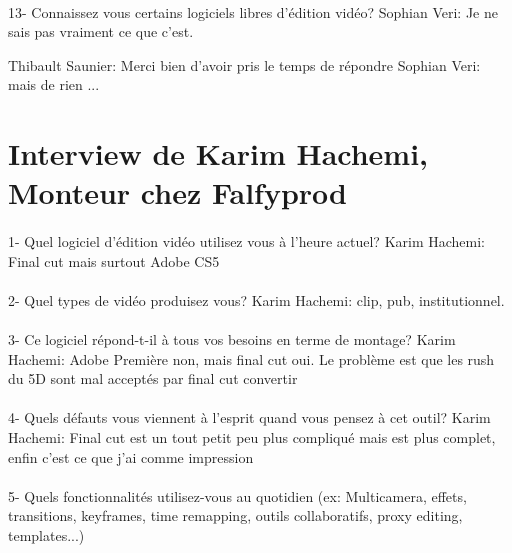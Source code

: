 \paragraph{}
13- Connaissez vous certains logiciels libres d'édition vidéo?
Sophian Veri: Je ne sais pas vraiment ce que c'est.

Thibault Saunier: Merci bien d'avoir pris le temps de répondre
    Sophian Veri: mais de rien
    ...

\section*{Interview de Karim Hachemi, Monteur chez Falfyprod}

\paragraph{}
1-  Quel logiciel d'édition vidéo utilisez vous à l'heure actuel?
Karim Hachemi: Final cut mais surtout Adobe CS5

\paragraph{}
2- Quel types de vidéo produisez vous?
Karim Hachemi: clip, pub, institutionnel.

\paragraph{}
3- Ce logiciel répond-t-il à tous vos besoins en terme de montage?
Karim Hachemi: Adobe Première non, mais final cut oui. Le problème est que les
rush du 5D sont mal acceptés par final cut%
convertir %
\paragraph{}
4- Quels défauts vous viennent à l'esprit quand vous pensez à cet outil?
Karim Hachemi: Final cut est un tout petit peu plus compliqué mais
est plus complet, enfin c'est ce que j'ai comme impression


\paragraph{}
5-  Quels fonctionnalités utilisez-vous au quotidien (ex: Multicamera, effets,
transitions, keyframes, time remapping, outils collaboratifs, proxy
editing, templates...)

